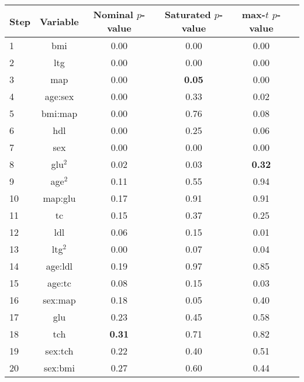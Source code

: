 \begin{tabular}{|l|c|c|c|c|c|}
\hline
 Step & Variable &  Nominal $p$-value &  Saturated $p$-value &  max-$t$ $p$-value \\
\hline
    1 &      bmi &            0.00 &              0.00 &         0.00 \\
    2 &      ltg &            0.00 &              0.00 &         0.00 \\
    3 &      map &            0.00 &             {\bf 0.05} &         0.00 \\
    4 &  age:sex &            0.00 &              0.33 &         0.02 \\
    5 &  bmi:map &            0.00 &              0.76 &         0.08 \\
    6 &      hdl &            0.00 &              0.25 &         0.06 \\
    7 &      sex &            0.00 &              0.00 &         0.00 \\
    8 &    glu$^2$ &            0.02 &              0.03 &         {\bf 0.32} \\
    9 &    age$^2$ &            0.11 &              0.55 &         0.94 \\
   10 &  map:glu &            0.17 &              0.91 &         0.91 \\
   11 &       tc &            0.15 &              0.37 &         0.25 \\
   12 &      ldl &            0.06 &              0.15 &         0.01 \\
   13 &    ltg$^2$ &            0.00 &              0.07 &         0.04 \\
   14 &  age:ldl &            0.19 &              0.97 &         0.85 \\
   15 &   age:tc &            0.08 &              0.15 &         0.03 \\
   16 &  sex:map &            0.18 &              0.05 &         0.40 \\
   17 &      glu &            0.23 &              0.45 &         0.58 \\
   18 &      tch &       {\bf     0.31} &              0.71 &         0.82 \\
   19 &  sex:tch &            0.22 &              0.40 &         0.51 \\
   20 &  sex:bmi &            0.27 &              0.60 &         0.44 \\
\hline
\end{tabular}

